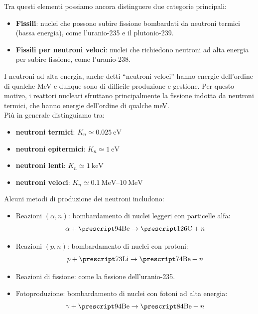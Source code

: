
Tra questi elementi possiamo ancora distinguere due categorie principali:
\begin{itemize}
    \item \textbf{Fissili}: nuclei che possono subire fissione bombardati da neutroni termici (bassa energia), come l'uranio-235 e il plutonio-239.
    \item \textbf{Fissili per neutroni veloci}: nuclei che richiedono neutroni ad alta energia per subire fissione, come l'uranio-238.
\end{itemize}
I neutroni ad alta energia, anche detti ``neutroni veloci'' hanno energie dell'ordine di qualche MeV e dunque sono di difficile produzione e gestione. Per questo motivo, i reattori nucleari sfruttano principalmente la fissione indotta da neutroni termici, che hanno energie dell'ordine di qualche meV.\\
Più in generale distinguiamo tra:
\begin{itemize}
    \item \textbf{neutroni termici}: $K_n \simeq \qty{0.025}{\electronvolt}$
    \item \textbf{neutroni epitermici}: $K_n \simeq \qty{1}{\electronvolt}$
    \item \textbf{neutroni lenti}: $K_n \simeq \qty{1}{\kilo\electronvolt}$
    \item \textbf{neutroni veloci}: $K_n \simeq \qtyrange{0.1}{10}{\mega\electronvolt}$
\end{itemize}
Alcuni metodi di produzione dei neutroni includono:
\begin{itemize}
    \item Reazioni $(\alpha, n)$: bombardamento di nuclei leggeri con particelle alfa:
    \begin{equation}
        \alpha + \atom{Be}{9}{4} \rightarrow \atom{C}{12}{6} + n
    \end{equation}
    \item Reazioni $(p, n)$: bombardamento di nuclei con protoni:
    \begin{equation}
        p + \atom{Li}{7}{3} \rightarrow \atom{Be}{7}{4} + n
    \end{equation}
    \item Reazioni di fissione: come la fissione dell'uranio-235.
    \item Fotoproduzione: bombardamento di nuclei con fotoni ad alta energia:
    \begin{equation}
        \gamma + \atom{Be}{9}{4} \rightarrow \atom{Be}{8}{4} + n
    \end{equation}
\end{itemize}
